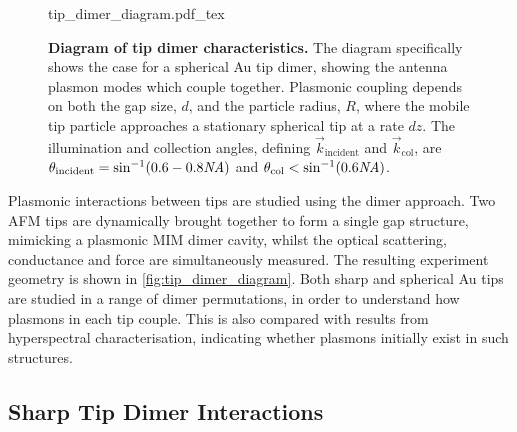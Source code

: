 \documentclass[a4paper]{article}
\begin{document}
\begin{figure}[bt]
\centering
\def\svgwidth{0.5\textwidth}
{tip_dimer_diagram.pdf_tex}
\caption[Diagram of tip dimer characteristics]{\textbf{Diagram of tip dimer characteristics.} The diagram specifically shows the case for a spherical Au tip dimer, showing the antenna plasmon modes which couple together. Plasmonic coupling depends on both the gap size, $d$, and the particle radius, $R$, where the mobile tip particle approaches a stationary spherical tip at a rate $dz$. The illumination and collection angles, defining $\vec{k}_{\mathrm{incident}}$ and $\vec{k}_{\mathrm{col}}$, are $\theta_{\mathrm{incident}} = \sin^{-1}(0.6-0.8\mathit{NA})$ and $\theta_{\mathrm{col}} < \sin^{-1}(0.6\mathit{NA})$.}
\label{fig:tip_dimer_diagram}
\end{figure}

Plasmonic interactions between tips are studied using the dimer approach. Two AFM tips are dynamically brought together to form a single gap structure, mimicking a plasmonic MIM dimer cavity, whilst the optical scattering, conductance and force are simultaneously measured. The resulting experiment geometry is shown in \autoref{fig:tip_dimer_diagram}. Both sharp and spherical Au tips are studied in a range of dimer permutations, in order to understand how plasmons in each tip couple. This is also compared with results from hyperspectral characterisation, indicating whether plasmons initially exist in such structures.

\subsection{Sharp Tip Dimer Interactions}
\end{document}
